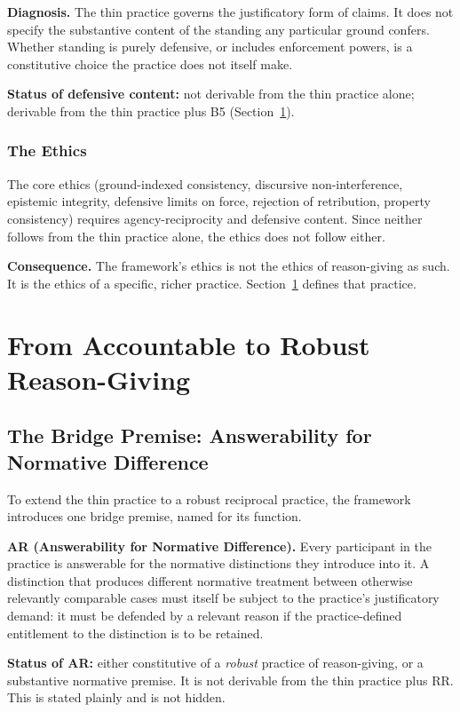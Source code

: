 \documentclass[11pt]{article}
\begin{document}
\textbf{Diagnosis.} The thin practice governs the justificatory form of claims. It does not specify the substantive content of the standing any particular ground confers. Whether standing is purely defensive, or includes enforcement powers, is a constitutive choice the practice does not itself make.

\textbf{Status of defensive content:} not derivable from the thin practice alone; derivable from the thin practice plus B5 (Section~\ref{sec:robust}).

\subsubsection{The Ethics}
The core ethics (ground-indexed consistency, discursive non-interference, epistemic integrity, defensive limits on force, rejection of retribution, property consistency) requires agency-reciprocity and defensive content. Since neither follows from the thin practice alone, the ethics does not follow either.

\textbf{Consequence.} The framework's ethics is not the ethics of reason-giving as such. It is the ethics of a specific, richer practice. Section~\ref{sec:robust} defines that practice.

\section{From Accountable to Robust Reason-Giving}\label{sec:robust}
\subsection{The Bridge Premise: Answerability for Normative Difference}
To extend the thin practice to a robust reciprocal practice, the framework introduces one bridge premise, named for its function.
\begin{paperbox}
\textbf{AR (Answerability for Normative Difference).} Every participant in the practice is answerable for the normative distinctions they introduce into it. A distinction that produces different normative treatment between otherwise relevantly comparable cases must itself be subject to the practice's justificatory demand: it must be defended by a relevant reason if the practice-defined entitlement to the distinction is to be retained.
\end{paperbox}

\textbf{Status of AR:} either constitutive of a \emph{robust} practice of reason-giving, or a substantive normative premise. It is not derivable from the thin practice plus RR. This is stated plainly and is not hidden.
\end{document}
